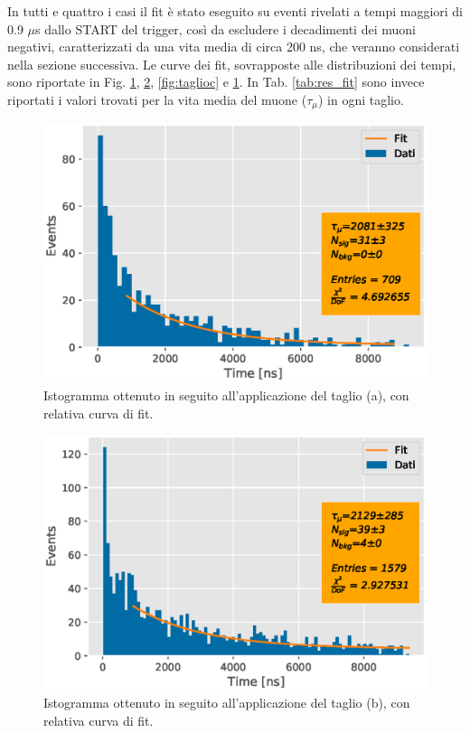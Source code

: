 \documentclass{standalone}
\begin{document}
In tutti e quattro i casi il fit è stato eseguito su eventi rivelati a tempi maggiori di 0.9 $\mu$s dallo START del trigger, così da escludere i decadimenti dei muoni negativi, caratterizzati da una vita media di circa 200 ns, che veranno considerati nella sezione successiva. Le curve dei fit, sovrapposte alle distribuzioni dei tempi, sono riportate in Fig. \ref{fig:taglioa}, \ref{fig:tagliob}, \ref{fig:taglioc} e \ref{fig:taglioa}. In Tab. \ref{tab:res_fit} sono invece riportati i valori trovati per la vita media del muone ($\tau_{\mu}$) in ogni taglio.


\begin{figure}[H]
  \centering
  \includegraphics[width=\textwidth]{plots/piano0&1.eps}
  \caption{Istogramma ottenuto in seguito all'applicazione del taglio (a), con relativa curva di fit.}
  \label{fig:taglioa}
\end{figure}

\begin{figure}[H]
  \centering
  \includegraphics[width=\textwidth]{plots/piano2.eps}
  \caption{Istogramma ottenuto in seguito all'applicazione del taglio (b), con relativa curva di fit.}
  \label{fig:tagliob}
\end{figure}
\end{document}
